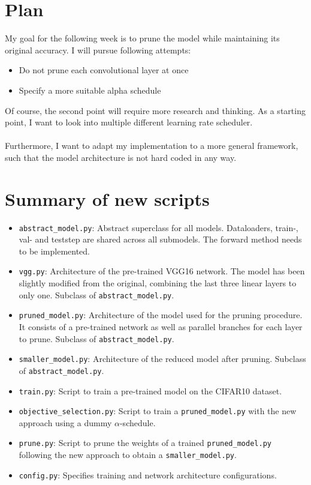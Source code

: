 \documentclass[10pt,twocolumn,letterpaper]{article}
\begin{document}
\section{Plan}
My goal for the following week is to prune the model while maintaining its original accuracy.
I will pursue following attempts:
\begin{itemize}
	\item Do not prune each convolutional layer at once
	\item Specify a more suitable alpha schedule
\end{itemize}
Of course, the second point will require more research and thinking.
As a starting point, I want to look into multiple different learning rate scheduler.\\\\
Furthermore, I want to adapt my implementation to a more general framework, such that the model architecture is not hard coded in any way.

\section{Summary of new scripts}
\begin{itemize}
	\item \texttt{abstract\_model.py}: Abstract superclass for all models.
		Dataloaders, train-, val- and teststep are shared across all submodels.
		The forward method needs to be implemented.
	\item \texttt{vgg.py}:
		Architecture of the pre-trained VGG16 network.
		The model has been slightly modified from the original, combining the last three linear layers to only one.
		Subclass of \texttt{abstract\_model.py}.
	\item \texttt{pruned\_model.py}: Architecture of the model used for the pruning procedure.
		It consists of a pre-trained network as well as parallel branches for each layer to prune.
		Subclass of \texttt{abstract\_model.py}.
	\item \texttt{smaller\_model.py}: Architecture of the reduced model after pruning.
		Subclass of \texttt{abstract\_model.py}.
	\item \texttt{train.py}: Script to train a pre-trained model on the CIFAR10 dataset.
	\item \texttt{objective\_selection.py}: Script to train a \texttt{pruned\_model.py} with the new approach using a dummy $\alpha$-schedule.
	\item \texttt{prune.py}: Script to prune the weights of a trained \texttt{pruned\_model.py} following the new approach to obtain a \texttt{smaller\_model.py}.
	\item \texttt{config.py}: Specifies training and network architecture configurations.
\end{itemize}

{\small


}
\end{document}
